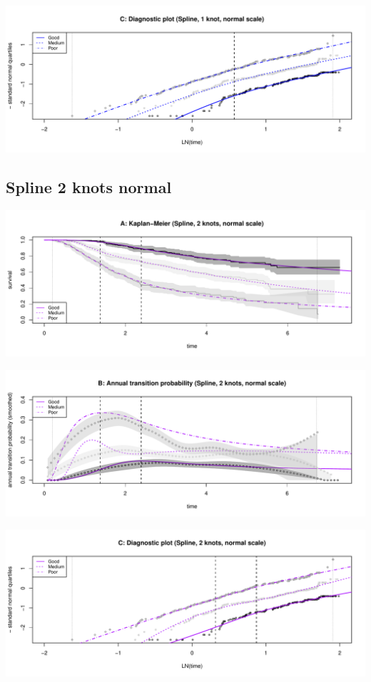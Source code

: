 \documentclass[
]{article}
\begin{document}
\begin{flushleft}\includegraphics[height=0.25\textheight]{Images/spline_norm1-3} \end{flushleft}

\hypertarget{spline-2-knots-normal}{%
\subsection{Spline 2 knots normal}\label{spline-2-knots-normal}}

\begin{flushleft}\includegraphics[height=0.25\textheight]{Images/spline_norm2-1} \end{flushleft}

\begin{flushleft}\includegraphics[height=0.25\textheight]{Images/spline_norm2-2} \end{flushleft}

\begin{flushleft}\includegraphics[height=0.25\textheight]{Images/spline_norm2-3} \end{flushleft}
\end{document}
